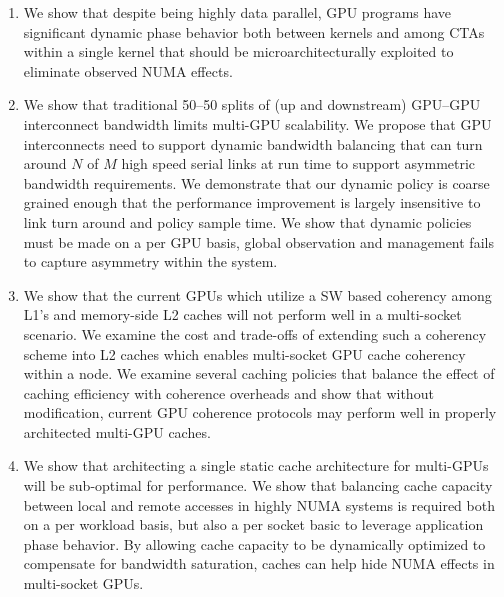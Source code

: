 \begin{enumerate}
\item
We show that despite being highly data parallel, GPU programs have significant
dynamic phase behavior both between kernels and among CTAs within a single
kernel that should be microarchitecturally exploited to eliminate observed
NUMA effects.

\item
We show that traditional 50--50 splits of (up and 
downstream) GPU--GPU interconnect bandwidth limits multi-GPU scalability.  We propose
that GPU interconnects need to support dynamic bandwidth balancing that can
turn around $N$ of $M$ high speed serial links at run time to support asymmetric
bandwidth requirements.  We demonstrate that our dynamic policy is coarse
grained enough that the performance improvement is largely insensitive to link turn 
around and policy sample time.  We show that dynamic policies must be made on a
per GPU basis, global observation and management fails to capture asymmetry 
within the system.

\item
We show that the current GPUs which utilize a SW based coherency among L1's and 
memory-side L2 caches will not perform well in a multi-socket scenario.  
We examine the cost and trade-offs of extending such a coherency scheme into L2 caches 
which enables multi-socket GPU cache coherency within a node.  We examine several
caching policies that balance the effect of caching efficiency with coherence overheads
and show that without modification, current GPU coherence protocols may perform
well in properly architected multi-GPU caches.

\item
We show that architecting a single static cache architecture for multi-GPUs will
be sub-optimal for performance. We show that balancing cache capacity between
local and remote accesses in highly NUMA systems is required both on a per
workload basis, but also a per socket basic to leverage application phase
behavior.  By allowing cache capacity to be dynamically optimized to compensate for
bandwidth saturation, caches can help hide NUMA effects in multi-socket GPUs.






\end{enumerate}
